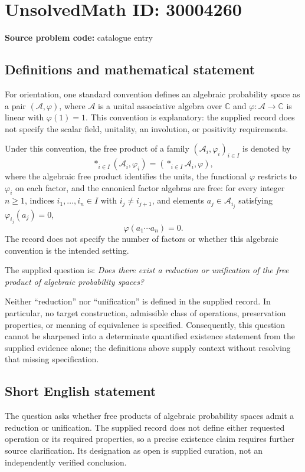 \documentclass[11pt]{article}
\newcommand{\C}{\mathbb{C}}
\begin{document}
\section*{UnsolvedMath ID: 30004260}
\textbf{Source problem code:} catalogue entry
\subsection{Definitions and mathematical statement}
For orientation, one standard convention defines an algebraic probability space as a pair \((\mathcal A,\varphi)\), where \(\mathcal A\) is a unital associative algebra over \(\C\) and \(\varphi:\mathcal A\to\C\) is linear with \(\varphi(1)=1\). This convention is explanatory: the supplied record does not specify the scalar field, unitality, an involution, or positivity requirements.

Under this convention, the free product of a family \((\mathcal A_i,\varphi_i)_{i\in I}\) is denoted by
\[
\mathop{*}_{i\in I}(\mathcal A_i,\varphi_i)
=\left(\mathop{*}_{i\in I}\mathcal A_i,\varphi\right),
\]
where the algebraic free product identifies the units, the functional \(\varphi\) restricts to \(\varphi_i\) on each factor, and the canonical factor algebras are free: for every integer \(n\geq 1\), indices \(i_1,\ldots,i_n\in I\) with \(i_j\neq i_{j+1}\), and elements \(a_j\in\mathcal A_{i_j}\) satisfying \(\varphi_{i_j}(a_j)=0\),
\[
\varphi(a_1\cdots a_n)=0.
\]
The record does not specify the number of factors or whether this algebraic convention is the intended setting.

The supplied question is: \emph{Does there exist a reduction or unification of the free product of algebraic probability spaces?}

Neither ``reduction'' nor ``unification'' is defined in the supplied record. In particular, no target construction, admissible class of operations, preservation properties, or meaning of equivalence is specified. Consequently, this question cannot be sharpened into a determinate quantified existence statement from the supplied evidence alone; the definitions above supply context without resolving that missing specification.
\subsection{Short English statement}
The question asks whether free products of algebraic probability spaces admit a reduction or unification. The supplied record does not define either requested operation or its required properties, so a precise existence claim requires further source clarification. Its designation as open is supplied curation, not an independently verified conclusion.
\end{document}
